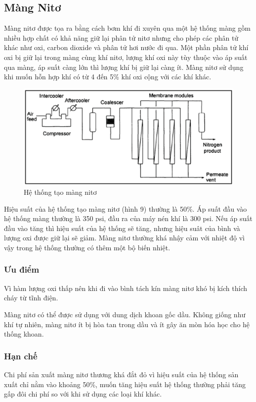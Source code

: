 \documentclass[13pt,a4paper]{article}
\begin{document}
\subsection{Màng Nitơ}
	Màng nitơ được tọa ra bằng cách bơm khí đi xuyên qua một hệ thống màng gồm nhiều hợp chất có khả năng giữ lại phân tử nitơ nhưng cho phép các phân tử khác như oxi, carbon dioxide và phân tử hơi nước đi qua. Một phần phân tử khí oxi bị giữ lại trong màng cùng khí nitơ, lượng khí oxi này tùy thuộc vào áp suất qua màng, áp suất càng lớn thì lượng khí bị giữ lại càng ít. Màng nitơ sử dụng khi muốn hỗn hợp khí có từ 4 đến 5\% khí oxi cộng với các khí khác. 
	\begin{figure}[h]
	\centering
	\includegraphics[scale=.5]{Figs/Fig9.png}
	\caption{Hệ thống tạo màng nitơ}
	\end{figure}
	\par
	Hiệu suất của hệ thống tạo màng nitơ (hình 9)  thường là 50\%. Áp suất đầu vào hệ thống màng thường là 350 psi, đầu ra của máy nén khí là 300 psi. Nếu áp suất đầu vào tăng thì hiệu suất của hệ thống sẽ tăng, nhưng hiệu suât của bình và lượng oxi được giữ lại sẽ giảm. Màng nitơ thường khá nhậy cảm với nhiệt độ vì vậy trong hệ thống thường có thêm một bộ biến nhiệt. 
	\subsubsection{Ưu điểm}
		Vì hàm lượng oxi thấp nên khi đi vào bình tách kín màng nitơ khó bị kích thích cháy từ tĩnh điện.\par
		Màng nitơ có thể được sử dụng với dung dịch khoan gốc dầu. Không giống như khí tự nhiên, màng nitơ ít bị hòa tan trong dầu và ít gây ăn mòn hóa học cho hệ thống khoan.
	\subsubsection{Hạn chế}
		Chi phí sản xuất màng nitơ thương khá đắt đỏ vì hiệu suất của hệ thống sản xuất chỉ nằm vào khoảng 50\%, muốn tăng hiệu suất hệ thống thường phải tăng gấp đôi chi phí so với khi sử dụng các loại khí khác.
\end{document}
